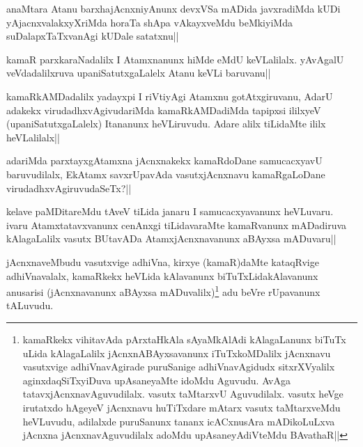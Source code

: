 \begin{artha}
anaMtara Atanu barxhajAcnxniyAnunx devxVSa mADida javxradiMda kUDi yAjacnxvalakxyXriMda horaTa shApa vAkayxveMdu beMkiyiMda suDalapxTaTxvanAgi kUDale satatxnu||
\end{artha}


\begin{artha}
kamaR parxkaraNadalilx I Atamxnanunx hiMde eMdU keVLalilalx. yAvAgalU veVdadalilxruva upaniSatutxgaLalelx Atanu keVLi baruvanu||
\end{artha}


\begin{artha}
kamaRkAMDadalilx yadayxpi I riVtiyAgi Atamxnu gotAtxgiruvanu, AdarU adakekx virudadhxvAgivudariMda kamaRkAMDadiMda tapipxsi ililxyeV (upaniSatutxgaLalelx) Itananunx heVLiruvudu. Adare alilx tiLidaMte ililx heVLalilalx||
\end{artha}


\begin{artha}
adariMda parxtayxgAtamxna jAcnxnakekx kamaRdoDane samucacxyavU baruvudilalx, EkAtamx savxrUpavAda vasutxjAcnxnavu kamaRgaLoDane virudadhxvAgiruvudaSeTx?||
\end{artha}


\begin{artha}
kelave paMDitareMdu tAveV tiLida janaru I samucacxyavanunx heVLuvaru. ivaru Atamxtatavxvanunx cenAnxgi tiLidavaraMte kamaRvanunx mADadiruva kAlagaLalilx vasutx BUtavADa AtamxjAcnxnavanunx aBAyxsa mADuvaru||
\end{artha}


\begin{artha}
jAcnxnaveMbudu vasutxvige adhiVna, kirxye (kamaR)daMte kataqRvige adhiVnavalalx, kamaRkekx heVLida kAlavanunx biTuTxLidakAlavanunx anusarisi (jAcnxnavanunx aBAyxsa mADuvalilx)\footnote[1]{kamaRkekx vihitavAda pArxtaHkAla sAyaMkAlAdi kAlagaLanunx biTuTx uLida kAlagaLalilx jAcnxnABAyxsavanunx iTuTxkoMDalilx jAcnxnavu vasutxvige adhiVnavAgirade puruSanige adhiVnavAgidudx sitxrXVyalilx aginxdaqSiTxyiDuva upAsaneyaMte idoMdu Aguvudu. AvAga tatavxjAcnxnavAguvudilalx. vasutx taMtarxvU Aguvudilalx. vasutx heVge irutatxdo hAgeyeV jAcnxnavu huTiTxdare mAtarx vasutx taMtarxveMdu heVLuvudu, adilalxde puruSanunx tananx icACxnusAra mADikoLuLxva jAcnxna jAcnxnavAguvudilalx adoMdu upAsaneyAdiVteMdu BAvathaR||} adu beVre rUpavanunx tALuvudu.
\end{artha}

